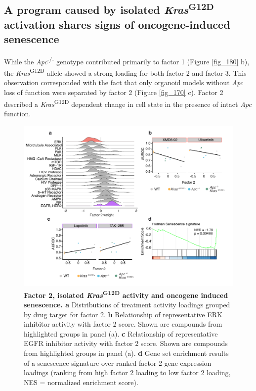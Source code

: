 \begin{flushleft}
\newpage

\subsection{A program caused by isolated \textit{Kras}\textsuperscript{G12D} activation shares signs of oncogene-induced senescence}
While the \textit{Apc}\textsuperscript{-/-}  genotype contributed primarily to factor 1 (Figure \ref{fig_180} b), the \textit{Kras}\textsuperscript{G12D} allele showed a strong loading for both factor 2 and factor 3. This observation corresponded with the fact that only organoid models without \textit{Apc} loss of function were separated by factor 2 (Figure \ref{fig_170} c). Factor 2 described a \textit{Kras}\textsuperscript{G12D} dependent change in cell state in the presence of intact \textit{Apc} function.


\begin{figure}[h!]
\centering
\includegraphics[scale=0.75,
                keepaspectratio]{figures/adenomaprofiling/pdf/fig_3_1_2.pdf}
\caption[Factor 2, isolated \textit{Kras}\textsuperscript{G12D} activity and oncogene induced senescence]{\textbf{Factor 2, isolated \textit{Kras}\textsuperscript{G12D} activity and oncogene induced senescence. a} Distributions of treatment activity loadings grouped by drug target for factor 2. \textbf{b} Relationship of representative ERK inhibitor activity with factor 2 score. Shown are compounds from highlighted groups in panel (a). \textbf{c} Relationship of representative EGFR inhibitor activity with factor 2 score. Shown are compounds from highlighted groups in panel (a). \textbf{d} Gene set enrichment results of a senescence signature \citep{fridmanCriticalPathwaysCellular2008} over ranked factor 2 gene expression loadings (ranking from high factor 2 loading to low factor 2 loading, NES = normalized enrichment score).}
\label{fig_200}
\end{figure}


\end{flushleft}
